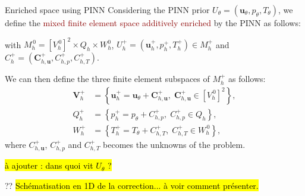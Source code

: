 \begin{frame}{Enriched space using PINN} %
    Considering the PINN prior $U_\theta = (\bm{u}_\theta, p_\theta, T_\theta)$, we define the \textcolor{darkred}{mixed finite element space additively enriched} by the PINN as follows:
    
    \begin{center}
    \end{center}

    with $M_h^{\, 0}=[V_h^{\, 0}]^2 \times Q_h \times W_h^0$,
    $U_h^+ = (\bm{u}_h^+, p_h^+, T_h^+) \in M_h^+$ and $C_h^+ = (\bm{C}_{h,\bm{u}}^+, C_{h,p}^+, C_{h,T}^+)$.

    \vspace{8pt}

    We can then define the three finite element subspaces of $M_h^+$ as follows:
    \begin{align*}
        \bm{V}_h^+ &= \left\{\bm{u}_h^+ = \bm{u}_\theta + \bm{C}_{h,\bm{u}}^+, \; \bm{C}_{h,\bm{u}}^+ \in [V_h^{\, 0}]^2\right\}, \\
        Q_h^+ &= \left\{p_h^+ = p_\theta + C_{h,p}^+, \; C_{h,p}^+ \in Q_h\right\}, \\
        W_h^+ &= \left\{T_h^+ = T_\theta + C_{h,T}^+, \; C_{h,T}^+ \in W_h^{\, 0}\right\},
    \end{align*}
    where $C_{h,\bm{u}}^+$, $C_{h,p}^+$ and $C_{h,T}^+$ becomes the unknowns of the problem.
    
    \vspace{5pt}
    \hl{à ajouter : dans quoi vit $U_\theta$ ?}
\end{frame}

\begin{frame}{??}
    \hl{Schématisation en 1D de la correction... à voir comment présenter.}
    \begin{center}    
    \end{center}
\end{frame}

